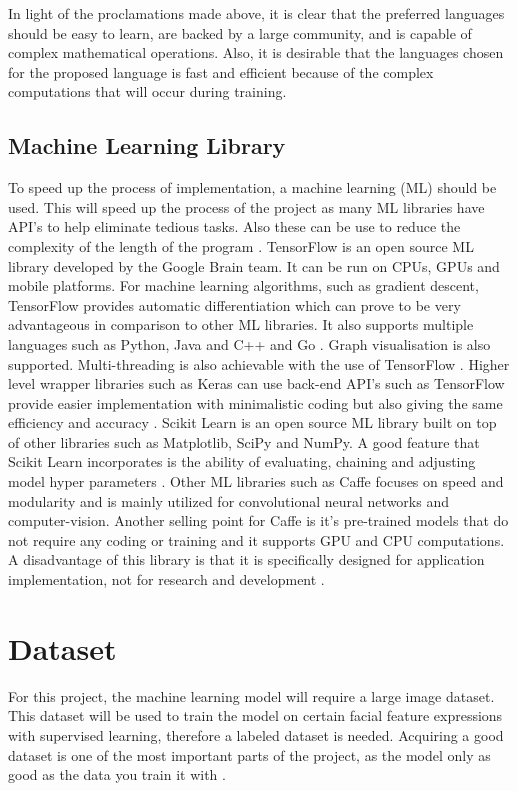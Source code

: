In light of the proclamations made above, it is clear that the preferred languages should be easy to learn, are backed by a large community, and is capable of complex mathematical operations. Also, it is desirable that the languages chosen for the proposed language is fast and efficient because of the complex computations that will occur during training.

\newpage

\subsection{Machine Learning Library}
To speed up the process of implementation, a machine learning (ML) should be used. This will speed up the process of the project as many ML libraries have API's to help eliminate tedious tasks. Also these can be use to reduce the complexity of the length of the program \citep{jain}.
TensorFlow is an open source ML library developed by the Google Brain team. It can be run on CPUs, GPUs and mobile platforms. For machine learning algorithms, such as gradient descent, TensorFlow provides automatic differentiation which can prove to be very advantageous in comparison to other ML libraries. It also supports multiple languages such as Python, Java and C++ and Go \citep{jain}. Graph visualisation is also supported. Multi-threading is also achievable with the use of TensorFlow \citep{jain}. Higher level wrapper libraries such as Keras can use back-end API's such as TensorFlow provide easier implementation with minimalistic coding but also giving the same efficiency and accuracy \citep{lee_keras}. Scikit Learn is an open source ML library built on top of other libraries such as Matplotlib, SciPy and NumPy. A good feature that Scikit Learn incorporates is the ability of evaluating, chaining and adjusting model hyper parameters \citep{jain}.
Other ML libraries such as Caffe focuses on speed and modularity and is mainly utilized for convolutional neural networks and computer-vision. Another selling point for Caffe is it's pre-trained models that do not require any coding or training and it supports GPU and CPU computations. A disadvantage of this library is that it is specifically designed for application implementation, not for research and development \citep{jain}.

\section{Dataset}
For this project, the machine learning model will require a large image dataset. This dataset will be used to train the model on certain facial feature expressions with supervised learning, therefore a labeled dataset is needed. Acquiring a good dataset is one of the most important parts of the project, as the model only as good as the data you train it with \citep{capg}.

